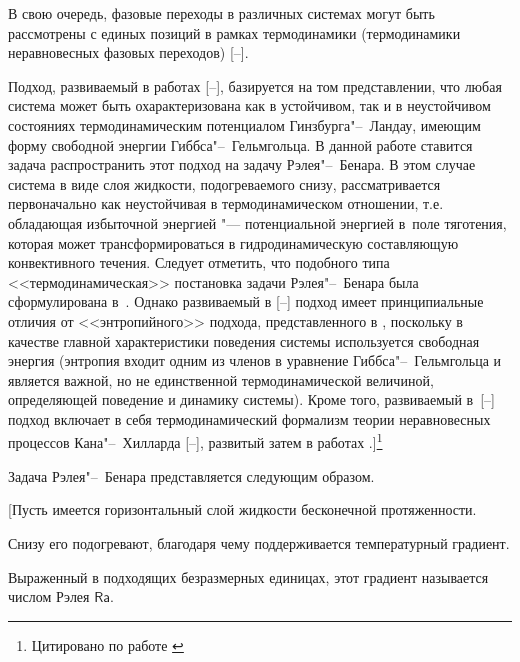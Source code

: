 В свою очередь, фазовые переходы в различных системах могут быть рассмотрены с единых позиций в рамках термодинамики (термодинамики неравновесных фазовых переходов) [--].



Подход, развиваемый в работах [--], базируется на том представлении, что любая система может быть охарактеризована как в устойчивом, так и в неустойчивом состояниях термодинамическим потенциалом Гинзбурга"--~Ландау, имеющим форму свободной энергии Гиббса"--~Гельмгольца. В данной работе ставится задача распространить этот подход на задачу Рэлея"--~Бенара. В этом случае система в виде слоя жидкости, подогреваемого снизу, рассматривается первоначально как неустойчивая в термодинамическом отношении, т.е. обладающая избыточной энергией "--- потенциальной энергией в~поле тяготения, которая может трансформироваться в гидродинамическую составляющую конвективного течения. Следует отметить, что подобного типа <<термодинамическая>> постановка задачи Рэлея"--~Бенара была сформулирована в~\cite{lukashev:bib31}. Однако развиваемый в [--] подход имеет принципиальные отличия от <<энтропийного>> подхода, представленного в \cite{lukashev:bib31}, поскольку в качестве главной характеристики поведения системы используется свободная энергия (энтропия входит одним из членов в уравнение Гиббса"--~Гельмгольца и является важной, но не единственной термодинамической величиной, определяющей поведение и динамику системы). Кроме того, развиваемый \linebreak в~[--] подход включает в себя термодинамический формализм теории \linebreak неравновесных процессов Кана"--~Хилларда [--], развитый затем в работах \cite{lukashev:bib44,lukashev:bib45}.]\footnote{Цитировано по работе \cite[с. 24--25]{lukashev:add1}}



Задача Рэлея"--~Бенара представляется следующим образом.

[Пусть имеется горизонтальный слой жидкости бесконечной протяженности. 

Снизу его подогревают, благодаря чему поддерживается температурный градиент. 

Выраженный в подходящих безразмерных единицах, этот градиент называется числом Рэлея $\mathsf{Ra}$. 

